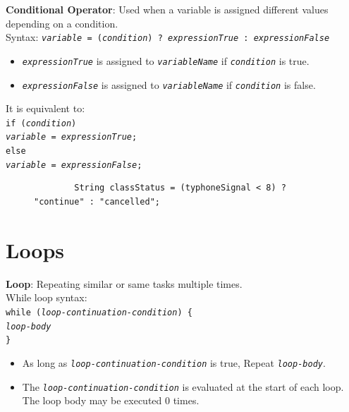 \documentclass{article}
\begin{document}
\textbf{Conditional Operator}: Used when a variable is assigned different values depending on a condition.\\
Syntax: \texttt{\textit{variable} = (\textit{condition}) ? \textit{expressionTrue} : \textit{expressionFalse}}
\begin{itemize}
	\item \texttt{\textit{expressionTrue}} is assigned to \texttt{\textit{variableName}} if  \texttt{\textit{condition}} is true.
	\item \texttt{\textit{expressionFalse}} is assigned to \texttt{\textit{variableName}} if  \texttt{\textit{condition}} is false.
\end{itemize}
It is equivalent to:\\
\texttt{if (\textit{condition})\\
\hspace*{2em}\textit{variable} = \textit{expressionTrue};\\
else\\
\hspace*{2em}\textit{variable} = \textit{expressionFalse};}\\

\begin{figure}[h!]
	\centering
	\begin{verbatim}
		String classStatus = (typhoneSignal < 8) ? "continue" : "cancelled";
	\end{verbatim}
\end{figure}
\newpage

\section{Loops}
\textbf{Loop}: Repeating similar or same tasks multiple times.\\
While loop syntax:\\
\texttt{while (\textit{loop-continuation-condition}) \{\\
\hspace*{2em}\textit{loop-body}\\
\}}
\begin{itemize}
	\item As long as \texttt{\textit{loop-continuation-condition}} is true, Repeat \texttt{\textit{loop-body}}.
	\item The \texttt{\textit{loop-continuation-condition}} is evaluated at the start of each loop. The loop body may be executed 0 times.
\end{itemize}
\end{document}
